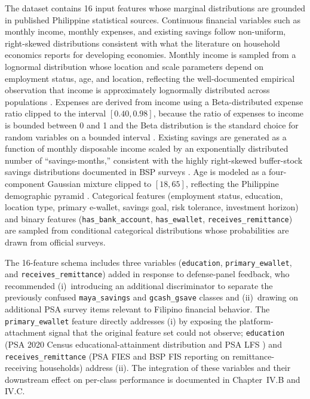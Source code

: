 \documentclass[journal]{./IEEE/IEEEtran}
\begin{document}
The dataset contains 16 input features whose marginal distributions are grounded in published Philippine statistical sources. Continuous financial variables such as monthly income, monthly expenses, and existing savings follow non-uniform, right-skewed distributions consistent with what the literature on household economics reports for developing economies. Monthly income is sampled from a lognormal distribution whose location and scale parameters depend on employment status, age, and location, reflecting the well-documented empirical observation that income is approximately lognormally distributed across populations \cite{ref54}. Expenses are derived from income using a Beta-distributed expense ratio clipped to the interval $[0.40, 0.98]$, because the ratio of expenses to income is bounded between 0 and 1 and the Beta distribution is the standard choice for random variables on a bounded interval \cite{ref54}. Existing savings are generated as a function of monthly disposable income scaled by an exponentially distributed number of ``savings-months,'' consistent with the highly right-skewed buffer-stock savings distributions documented in BSP surveys \cite{ref35}. Age is modeled as a four-component Gaussian mixture clipped to $[18, 65]$, reflecting the Philippine demographic pyramid \cite{ref39}. Categorical features (employment status, education, location type, primary e-wallet, savings goal, risk tolerance, investment horizon) and binary features (\texttt{has\_bank\_account}, \texttt{has\_ewallet}, \texttt{receives\_remittance}) are sampled from conditional categorical distributions whose probabilities are drawn from official surveys.

The 16-feature schema includes three variables (\texttt{education}, \texttt{primary\_ewallet}, and \texttt{receives\_remittance}) added in response to defense-panel feedback, who recommended (i)~introducing an additional discriminator to separate the previously confused \texttt{maya\_savings} and \texttt{gcash\_gsave} classes and (ii)~drawing on additional PSA survey items relevant to Filipino financial behavior. The \texttt{primary\_ewallet} feature directly addresses (i) by exposing the platform-attachment signal that the original feature set could not observe; \texttt{education} (PSA 2020 Census educational-attainment distribution \cite{ref39} and PSA LFS \cite{ref41}) and \texttt{receives\_remittance} (PSA FIES \cite{ref40} and BSP FIS \cite{ref35} reporting on remittance-receiving households) address (ii). The integration of these variables and their downstream effect on per-class performance is documented in Chapter~IV.B and IV.C.
\end{document}
